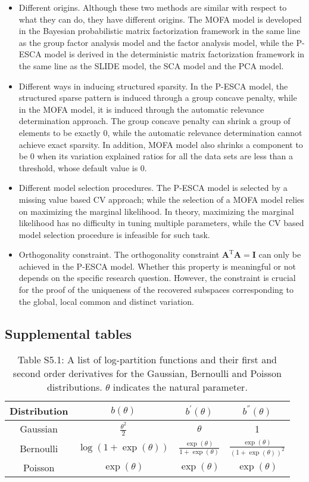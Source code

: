 \begin{itemize}
  \item Different origins. Although these two methods are similar with respect to what they can do, they have different origins. The MOFA model is developed in the Bayesian probabilistic matrix factorization framework in the same line as the group factor analysis model and the factor analysis model, while the P-ESCA model is derived in the deterministic matrix factorization framework in the same line as the SLIDE model, the SCA model and the PCA model.
  \item Different ways in inducing structured sparsity. In the P-ESCA model, the structured sparse pattern is induced through a group concave penalty, while in the MOFA model, it is induced through the automatic relevance determination approach. The group concave penalty can shrink a group of elements to be exactly 0, while the automatic relevance determination cannot achieve exact sparsity. In addition, MOFA model also shrinks a component to be 0 when its variation explained ratios for all the data sets are less than a threshold, whose default value is 0.
  \item Different model selection procedures. The P-ESCA model is selected by a missing value based CV approach; while the selection of a MOFA model relies on maximizing the marginal likelihood. In theory, maximizing the marginal likelihood has no difficulty in tuning multiple parameters, while the CV based model selection procedure is infeasible for such task.
  \item Orthogonality constraint. The orthogonality constraint $\mathbf{A}^{\text{T}}\mathbf{A} = \mathbf{I}$ can only be achieved in the P-ESCA model. Whether this property is meaningful or not depends on the specific research question. However, the constraint is crucial for the proof of the uniqueness of the recovered subspaces corresponding to the global, local common and distinct variation.
\end{itemize}

\subsection{Supplemental tables}
\begin{table}[htbp]
\centering
\caption*{Table S5.1: A list of log-partition functions and their first and second order derivatives for the Gaussian, Bernoulli and Poisson
distributions. $\theta$ indicates the natural parameter.}
\label{chapter5_tab:S1}
\begin{tabular}{cccc}
  \toprule
Distribution & $b(\theta)$ & $b^{'}(\theta)$ & $b^{''}(\theta)$ \\
  \midrule
Gaussian     & $\frac{\theta^2}{2}$    & $\theta$ & 1 \\
Bernoulli    & $\log(1+\exp(\theta))$ & $\frac{\exp(\theta)}{1+\exp(\theta)}$ & $\frac{\exp(\theta)}{(1+\exp(\theta))^2}$ \\
Poisson      & $\exp(\theta)$ & $\exp(\theta)$ & $\exp(\theta)$ \\
  \bottomrule
\end{tabular}
\end{table}


